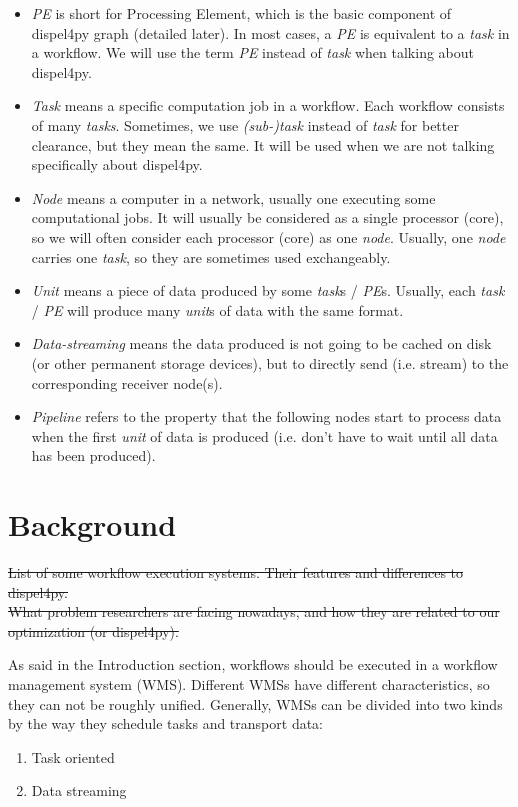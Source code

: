 \documentclass[•]{article}
\begin{document}
	\begin{itemize}
		\item \textit{PE} is short for Processing Element, which is the basic component of dispel4py graph (detailed later). In most cases, a \textit{PE} is equivalent to a \textit{task} in a workflow. We will use the term \textit{PE} instead of \textit{task} when talking about dispel4py.
		\item \textit{Task} means a specific computation job in a workflow. Each workflow consists of many \textit{tasks}. Sometimes, we use \textit{(sub-)task} instead of \textit{task} for better clearance, but they mean the same. It will be used when we are not talking specifically about dispel4py.
		\item \textit{Node} means a computer in a network, usually one executing some computational jobs. It will usually be considered as a single processor (core), so we will often consider each processor (core) as one \textit{node}. Usually, one \textit{node} carries one \textit{task}, so they are sometimes used exchangeably.
		\item \textit{Unit} means a piece of data produced by some \textit{task}s / \textit{PE}s. Usually, each \textit{task} / \textit{PE} will produce many \textit{unit}s of data with the same format.
		\item \textit{Data-streaming} means the data produced is not going to be cached on disk (or other permanent storage devices), but to directly send (i.e. stream) to the corresponding receiver node(s).
		\item \textit{Pipeline} refers to the property that the following nodes start to process data when the first \textit{unit} of data is produced (i.e. don't have to wait until all data has been produced).
	\end{itemize}
	
	
	\section{Background}	
	\sout{List of some workflow execution systems. Their features and differences to dispel4py. \\
	What problem researchers are facing nowadays, and how they are related to our optimization (or dispel4py).}
	
	As said in the Introduction section, workflows should be executed in a workflow management system (WMS). Different WMSs have different characteristics, so they can not be roughly unified.
	 Generally, WMSs can be divided into two kinds by the way they schedule tasks and transport data:
	\begin{enumerate}
		\item Task oriented
		\item Data streaming
	\end{enumerate}
	
\end{document}
